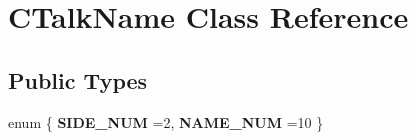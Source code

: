 \hypertarget{class_c_talk_name}{}\section{C\+Talk\+Name Class Reference}
\label{class_c_talk_name}
\subsection*{Public Types}
\begin{DoxyCompactItemize}
\item 
enum \{ {\bfseries S\+I\+D\+E\+\_\+\+N\+UM} =2, 
{\bfseries N\+A\+M\+E\+\_\+\+N\+UM} =10
 \}\hypertarget{class_c_talk_name_ab2a838e591222eaa9cd4e64859d5a237}{}\label{class_c_talk_name_ab2a838e591222eaa9cd4e64859d5a237}

\end{DoxyCompactItemize}
